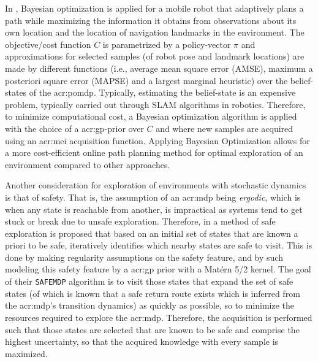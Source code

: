 In \cite{MartinezCantin2009}, Bayesian optimization is applied for a mobile robot that adaptively plans a path while maximizing the information it obtains from observations about its own location and the location of navigation landmarks in the environment.
The objective/cost function $C$ is parametrized by a policy-vector $\pi$ and approximations for selected samples (of robot pose and landmark locations) are made by different functions (i.e., average mean square error (AMSE), maximum a posteriori square error (MAPSE) and a largest marginal heuristic) over the belief-states of the \acrshort{acr:pomdp}.
Typically, estimating the belief-state is an expensive problem, typically carried out through SLAM algorithms in robotics.
Therefore, to minimize computational cost, a Bayesian optimization algorithm is applied with the choice of a \acrshort{acr:gp}-prior over $C$ and where new samples are acquired using an \acrshort{acr:mei} acquisition function.
Applying Bayesian Optimization allows for a more cost-efficient online path planning method for optimal exploration of an environment compared to other approaches.

Another consideration for exploration of environments with stochastic dynamics is that of safety. That is, the assumption of an \acrshort{acr:mdp} being \textit{ergodic}, which is when any state is reachable from another, is impractical as systems tend to get stuck or break due to unsafe exploration. Therefore, in \cite{turchetta2016safe} a method of safe exploration is proposed that based on an initial set of states that are known a priori to be safe, iteratively identifies which nearby states are safe to visit.
This is done by making regularity assumptions on the safety feature, and by such modeling this safety feature by a \acrshort{acr:gp} prior with a Mat\'ern 5/2 kernel.
The goal of their \texttt{SAFEMDP} algorithm is to visit those states that expand the set of safe states (of which is known that a safe return route exists which is inferred from the \acrshort{acr:mdp}'s transition dynamics) as quickly as possible, so to minimize the resources required to explore the \acrshort{acr:mdp}.
Therefore, the acquisition is performed such that those states are selected that are known to be safe and comprise the highest uncertainty, so that the acquired knowledge with every sample is maximized.

